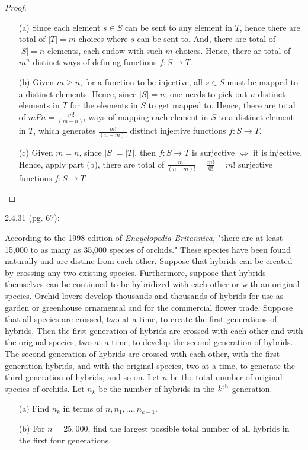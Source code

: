 \documentclass{article}
\begin{document}
\begin{proof}

    \hfil

    \begin{itemize}
        \item[(a)] Since each element $s \in S$ can be sent to any element in $T$, hence there are total of $|T|=m$ choices where $s$ can be sent to. And, there are total of $|S| = n$ elements, each endow with such $m$ choices. Hence, there ar total of $m^n$ distinct ways of defining functions $f:S \rightarrow T$.
        \item[(b)] Given $m\geq n$, for a function to be injective, all $s \in S$ must be mapped to a distinct elements. Hence, since $|S|=n$, one needs to pick out $n$ distinct elements in $T$ for the elements in $S$ to get mapped to. Hence, there are total of $mPn = \frac{m!}{(m-n)!}$ ways of mapping each element in $S$ to a distinct element in $T$, which generates $\frac{m!}{(n-m)!}$ distinct injective functions $f:S\rightarrow T$.
        \item[(c)] Given $m=n$, since $|S|=|T|$, then $f:S \rightarrow T$ is surjective $\iff$ it is injective. Hence, apply part (b), there are total of $\frac{m!}{(n-m)!}=\frac{m!}{0!}=m!$ surjective functions $f:S\rightarrow T$.   
    \end{itemize}
\end{proof}

\hfil

\begin{ques}\label{q4}
    2.4.31 (pg. 67):

    According to the 1998 edition of \emph{Encyclopedia Britannica}, "there are at least 15,000 to as many as 35,000 species of orchids." These species have been found naturally and are distinc from each other. Suppose that hybrids can be created by crossing any two existing species. Furthermore, suppose that hybrids themselves can be continued to be hybridized with each other or with an original species. Orchid lovers develop thousands and thousands of hybrids for use as garden or greenhouse ornamental and for the commercial flower trade. Suppose that all species are crossed, two at a time, to create the first generations of hybrids. Then the first generation of hybrids are crossed with each other and with the original species, two at a time, to develop the second generation of hybrids. The second generation of hybrids are crossed with each other, with the first generation hybrids, and with the original species, two at a time, to generate the third generation of hybrids, and so on. Let $n$ be the total number of original species of orchids. Let $n_k$ be the number of hybrids in the $k^\textmd{th}$ generation.
    \begin{itemize}
        \item[(a)] Find $n_k$ in terms of $n,n_1,...,n_{k-1}$.
        \item[(b)] For $n=25,000$, find the largest possible total number of all hybrids in the first four generations. 
    \end{itemize}
\end{ques}
\end{document}

